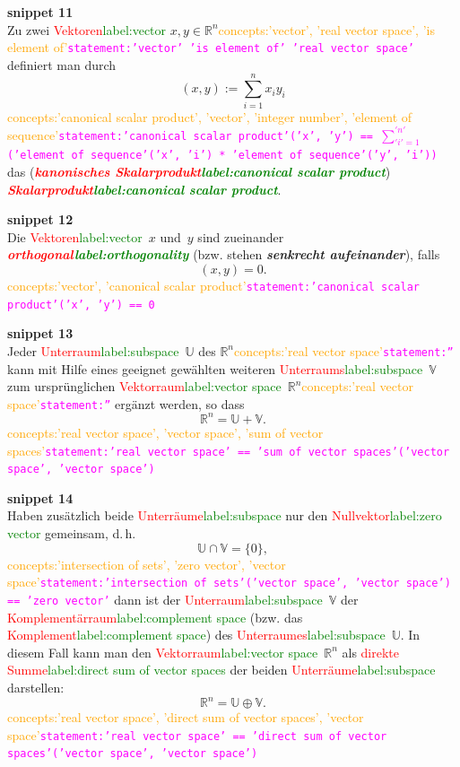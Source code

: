 \documentclass[a4paper,twoside,english,ngerman,deutsch,german,sectrefs,envcountsame,envcountchap]{svmono}
\newcommand{\setref}[2]{\textcolor{red}{#1}\textcolor{green}{#2}}
\newcommand{\snippet}[1]{\textbf{snippet #1}\\}
\newcommand{\eqnote}[2]{\textcolor{orange}{#1}\textcolor{magenta}{\texttt{#2}}}
\begin{document}
\snippet{11}
Zu zwei \setref{Vektoren}{label:vector} $x,y\in{\mathbb{R}}^{n}$\eqnote{concepts:'vector', 'real vector space', 'is element of'}{statement:'vector' 'is element of' 'real vector space'} definiert man durch
\begin{equation}
(x,y):=\sum_{i=1}^{n}x_{i}y_{i}\label{eq:skalarprodukt}
\end{equation}
\eqnote{concepts:'canonical scalar product', 'vector', 'integer number', 'element of sequence'}{statement:'canonical scalar product'('x', 'y') == $\sum_{'i'=1}^{'n'}$ ('element of sequence'('x', 'i') * 'element of sequence'('y', 'i'))}
das (\textbf{\em \setref{kanonisches Skalarprodukt}{label:canonical scalar product}}) \textbf{\em \setref{Skalarprodukt}{label:canonical scalar product}}.

\snippet{12}
Die \setref{Vektoren}{label:vector}~$x$ und~$y$ sind zueinander \textbf{\em \setref{orthogonal}{label:orthogonality}} (bzw. stehen \textbf{\em senkrecht aufeinander}), falls
\[
(x,y)=0.
\]\eqnote{concepts:'vector', 'canonical scalar product'}{statement:'canonical scalar product'('x', 'y') == 0}

\snippet{13}
Jeder \setref{Unterraum}{label:subspace}~$\mathbb{U}$ des ${\mathbb{R}}^{n}$\eqnote{concepts:'real vector space'}{statement:''} kann mit Hilfe eines geeignet gewählten weiteren \setref{Unterraums}{label:subspace}~$\mathbb{V}$ zum ursprünglichen
\setref{Vektorraum}{label:vector space}~${\mathbb{R}}^{n}$\eqnote{concepts:'real vector space'}{statement:''} ergänzt werden, so dass
\[
{\mathbb{R}}^{n}=\mathbb{U}+\mathbb{V}.
\]\eqnote{concepts:'real vector space', 'vector space', 'sum of vector spaces'}{statement:'real vector space' == 'sum of vector spaces'('vector space', 'vector space')}

\snippet{14}
Haben zusätzlich beide \setref{Unterräume}{label:subspace} nur den \setref{Nullvektor}{label:zero vector} gemeinsam, d.\,h.
\[
\mathbb{U}\cap\mathbb{V}=\{0\},
\]\eqnote{concepts:'intersection of sets', 'zero vector', 'vector space'}{statement:'intersection of sets'('vector space', 'vector space') == 'zero vector'}
dann ist der \setref{Unterraum}{label:subspace}~$\mathbb{V}$ der \setref{Komplementärraum}{label:complement space} (bzw. das \setref{Komplement}{label:complement space}) des \setref{Unterraumes}{label:subspace}~$\mathbb{U}$. In diesem Fall kann man den \setref{Vektorraum}{label:vector space}~${\mathbb{R}}^{n}$ als \setref{direkte Summe}{label:direct sum of vector spaces} der beiden \setref{Unterräume}{label:subspace} darstellen:
\[
{\mathbb{R}}^{n}=\mathbb{U}\oplus\mathbb{V}.
\]\eqnote{concepts:'real vector space', 'direct sum of vector spaces', 'vector space'}{statement:'real vector space' == 'direct sum of vector spaces'('vector space', 'vector space')}
\end{document}
